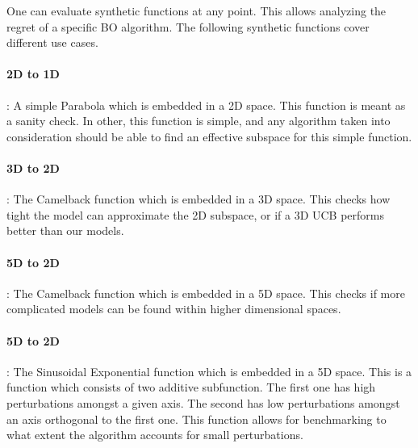 One can evaluate synthetic functions at any point.
This allows analyzing the regret of a specific BO algorithm.
The following synthetic functions cover different use cases.

\paragraph{2D to 1D}: A simple Parabola which is embedded in a 2D space.
This function is meant as a sanity check.
In other, this function is simple, and any algorithm taken into consideration should be able to find an effective subspace for this simple function.
\paragraph{3D to 2D}: The Camelback function which is embedded in a 3D space.
This checks how tight the model can approximate the 2D subspace, or if a 3D UCB performs better than our models.
\paragraph{5D to 2D}: The Camelback function which is embedded in a 5D space.
This checks if more complicated models can be found within higher dimensional spaces.
\paragraph{5D to 2D}: The Sinusoidal Exponential function which is embedded in a 5D space.
This is a function which consists of two additive subfunction. 
The first one has high perturbations amongst a given axis. 
The second has low perturbations amongst an axis orthogonal to the first one.
This function allows for benchmarking to what extent the algorithm accounts for small perturbations.
